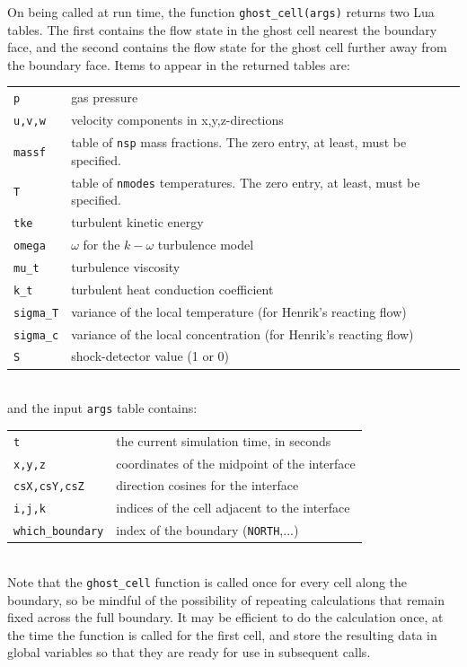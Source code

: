 \medskip
On being called at run time, the function \texttt{ghost\_cell(args)} returns two Lua tables. 
The first contains the flow state in the ghost cell nearest the boundary face, 
and the second contains the flow state for the ghost cell further away from the boundary face.
Items to appear in the returned tables are:\\
\begin{tabular}{lp{12cm}}
 \texttt{p} &  gas pressure \\
 \texttt{u,v,w} & velocity components in x,y,z-directions \\
 \texttt{massf} & table of \texttt{nsp} mass fractions. The zero entry, at least, must be specified. \\
 \texttt{T} & table of \texttt{nmodes} temperatures. The zero entry, at least, must be specified. \\
 \texttt{tke} &  turbulent kinetic energy \\
 \texttt{omega} &  $\omega$ for the $k-\omega$ turbulence model \\
 \texttt{mu\_t} &  turbulence viscosity \\
 \texttt{k\_t} &  turbulent heat conduction coefficient \\
 \texttt{sigma\_T} & variance of the local temperature (for Henrik's reacting flow) \\
 \texttt{sigma\_c} & variance of the local concentration (for Henrik's reacting flow) \\
 \texttt{S} & shock-detector value (1 or 0) \\
\end{tabular}\\
and the input \texttt{args} table contains:\\
\begin{tabular}{lp{12cm}}
 \texttt{t} &  the current simulation time, in seconds \\
 \texttt{x,y,z} &  coordinates of the midpoint of the interface\\
 \texttt{csX,csY,csZ} &  direction cosines for the interface\\
 \texttt{i,j,k} &  indices of the cell adjacent to the interface\\
 \texttt{which\_boundary} & index of the boundary (\texttt{NORTH},...) \\
\end{tabular}\\
Note that the \texttt{ghost\_cell} function is called once for every cell along the boundary,
so be mindful of the possibility of repeating calculations that remain fixed across the full boundary.
It may be efficient to do the calculation once, at the time the function is called for the first cell,
and store the resulting data in global variables so that they are ready for use in subsequent calls. 

